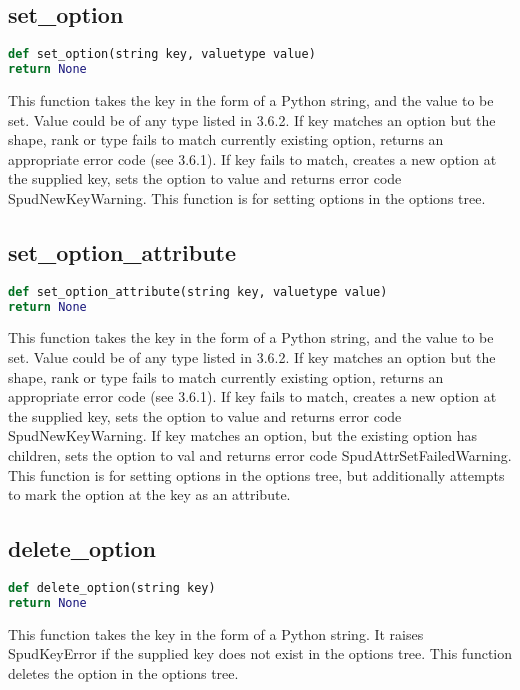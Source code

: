 \documentclass[a4paper, 11pt]{book}
\begin{document}
\subsection{set\_option}

\begin{lstlisting}[language=Python]
def set_option(string key, valuetype value)
return None
\end{lstlisting}

This function takes the key in the form of a Python string, and the value to be set. 
Value could be of any type listed in 3.6.2.
If key matches an option but the shape, rank or type fails to match currently existing option,
returns an appropriate error code (see 3.6.1).
If key fails to match, creates a new option at the supplied key, sets the option to value and returns
error code SpudNewKeyWarning.
This function is for setting options in the options tree.

\subsection{set\_option\_attribute}

\begin{lstlisting}[language=Python]
def set_option_attribute(string key, valuetype value)
return None
\end{lstlisting}

This function takes the key in the form of a Python string, and the value to be set. 
Value could be of any type listed in 3.6.2.
If key matches an option but the shape, rank or type fails to match currently existing option,
returns an appropriate error code (see 3.6.1).
If key fails to match, creates a new option at the supplied key, sets the option to value and returns
error code SpudNewKeyWarning.
If key matches an option, but the existing option has children, sets the option to val and
returns error code SpudAttrSetFailedWarning.
This function is for setting options in the options tree, but additionally attempts to mark the option at the key as an attribute.

\subsection{delete\_option}

\begin{lstlisting}[language=Python]
def delete_option(string key)
return None
\end{lstlisting}

This function takes the key in the form of a Python string. 
It raises SpudKeyError if the supplied key does not exist in the options tree.
This function deletes the option in the options tree.
\end{document}
